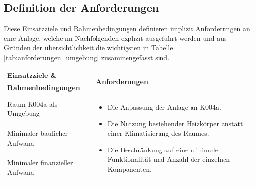 \subsection{Definition der Anforderungen}

Diese Einsatzziele und Rahmenbedingungen definieren implizit Anforderungen an eine Anlage, welche im Nachfolgenden explizit ausgeführt werden und aus Gründen der übersichtlichkeit die wichtigsten in Tabelle \ref{tab:anforderungen_umgebung} zusammengefasst sind.


\begin{table}[H]
\centering
\small
\renewcommand{\arraystretch}{1.3}
\begin{tabularx}{1\textwidth}{m{}m{}}

\toprule

\textbf{Einsatzziele \&} & \multirow{2}{\hsize}{\textbf{Anforderungen}} \\ 
\textbf{Rahmenbedingungen} & \\

\cmidrule[0.5pt](r{0.25em}){1-1} 
\cmidrule[0.5pt](l{0.25em}){2-2}

Raum K004a als Umgebung  & \multirow{3}{\hsize}{
\begin{minipage}[t]{0.57\textwidth}
\begin{itemize}[itemsep=0pt,topsep=0pt,leftmargin=5mm]
	\item Die Anpassung der Anlage an K004a.
	\item Die Nutzung bestehender Heizkörper anstatt einer Klimatisierung des Raumes. 
	\item Die Beschränkung auf eine minimale Funktionalität und Anzahl der einzelnen Komponenten. 
\end{itemize}
\end{minipage}
}
 \\
	
\cmidrule[0.1pt](lr{2em}){1-1} 
Minimaler baulicher Aufwand & \\

\cmidrule[0.1pt](lr{2em}){1-1} 
Minimaler finanzieller \newline Aufwand &\\ 



\cmidrule[0.5pt](r{0.25em}){1-1} 
\cmidrule[0.5pt](l{0.25em}){2-2}


\end{tabularx}
\end{table}
